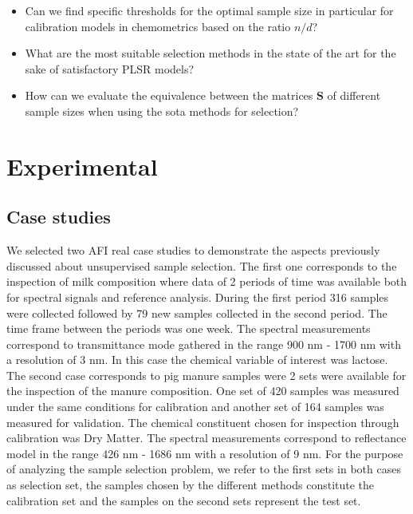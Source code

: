 \documentclass{article}
\begin{document}
\begin{itemize}
    \item Can we find specific thresholds for the optimal sample size in particular for calibration models in chemometrics based on the ratio $n/d$?
    \item What are the most suitable selection methods in the state of the art for the sake of satisfactory PLSR models?
    \item How can we evaluate the equivalence between the matrices $\mathbf{S}$ of different sample sizes when using the sota methods for selection?
\end{itemize}


\section*{Experimental}\label{experimental}

\subsection*{Case studies}\label{data}

We selected two AFI real case studies to demonstrate the aspects previously discussed about unsupervised sample selection. The first one corresponds to the inspection of milk composition where data of 2 periods of time was available both for spectral signals and reference analysis. During the first period 316 samples were collected followed by 79 new samples collected in the second period. The time frame between the periods was one week. The spectral measurements correspond to transmittance mode gathered in the range 900 nm - 1700 nm with a resolution of 3 nm. In this case the chemical variable of interest was lactose. 
The second case corresponds to pig manure samples were 2 sets were available for the inspection of the manure composition. One set of 420 samples was measured under the same conditions for calibration and another set of 164 samples was measured for validation. The chemical constituent chosen for inspection through calibration was Dry Matter. The spectral measurements correspond to reflectance model in the range 426 nm - 1686 nm with a resolution of 9 nm.
For the purpose of analyzing the sample selection problem, we refer to the first sets in both cases as selection set, the samples chosen by the different methods constitute the calibration set and the samples on the second sets represent the test set. 
\end{document}
